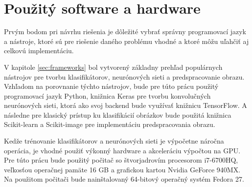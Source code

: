 
\section{Použitý software a hardware}
Prvým bodom pri návrhu riešenia je dôležité vybrať správny programovací jazyk a nástroje, ktoré sú pre riešenie daného problému vhodné
    a ktoré môžu uľahčiť aj celkovú implementáciu.

V kapitole \ref{sec:frameworks} bol vytvorený základny prehľad populárnych nástrojov pre tvorbu klasifikátorov, neurónových sieti a predspracovanie obrazu.
Vzhľadom na porovnanie týchto nástrojov, bude pre túto prácu použitý programovací jazyk Python, knižnica Keras pre tvorbu konvolučných neurónových sieti, ktorá
    ako svoj backend bude využívať knižnicu TensorFlow.
A následne pre klasický prístup ku klasifikácií obrázkov bude použitá knižnica Scikit-learn a Scikit-image pre implementáciu predspracovania obrazu.

Kedže trénovanie klasifikátorov a neurónových sieti je výpočetne náročna operácia, je vhodné použiť výkonný hardware a akceleráciu výpočtou na GPU.
Pre túto prácu bude použitý počitač so štvorjadrovím procesorom i7-6700HQ, veľkosťou operačnej pamäte 16 GB a grafickou kartou Nvidia GeForce 940MX.
Na použitom počitači bude nainštalovaný 64-bitový operačný systém Fedora 27.
